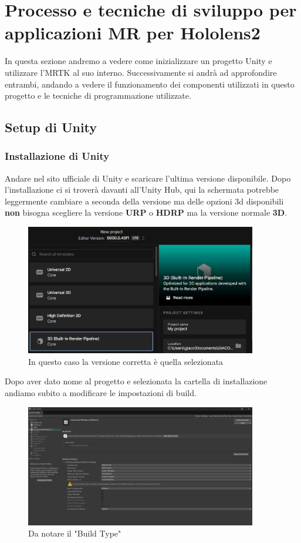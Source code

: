 \chapter{Processo e tecniche di sviluppo per applicazioni MR per Hololens2}
\pagestyle{plain}
In questa sezione andremo a vedere come inizializzare un progetto Unity e utilizzare l'MRTK al suo interno. Successivamente si andrà ad approfondire entrambi, andando a vedere il funzionamento dei componenti utilizzati in questo progetto e le tecniche di programmazione utilizzate. 


\section{Setup di Unity}
\subsection{Installazione di Unity}
Andare nel sito ufficiale di Unity e scaricare l'ultima versione disponibile. Dopo l'installazione ci si troverà davanti all'Unity Hub, qui la schermata potrebbe leggermente cambiare a seconda della versione ma delle opzioni 3d disponibili \textbf{non} bisogna scegliere la versione \textbf{URP} o \textbf{HDRP} ma la versione normale \textbf{3D}. 
\begin{figure}[H]
    \centering
    \includegraphics[width=0.9\textwidth,height=\textheight,keepaspectratio]{figures/chapter_1/unityHub.png}
    \caption{In questo caso la versione corretta è quella selezionata}
\end{figure}
Dopo aver dato nome al progetto e selezionata la cartella di installazione andiamo subito a modificare le impostazioni di build.
\begin{figure}[H]
    \centering
    \includegraphics[width=0.9\textwidth,height=\textheight,keepaspectratio]{figures/chapter_1/impostazioniBuild.png}
    \caption{Da notare il "Build Type"}
\end{figure}
